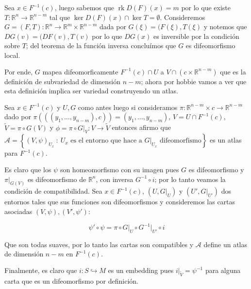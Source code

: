 \documentclass[11pt]{article}
\newcommand{\A}{\mathcal{A}}
\newcommand{\inc}{\hookrightarrow}
\newcommand{\R}{{\mathbb{R}}}
\newcommand\tq{~:~}
\newcommand{\sett}[1]{\left\lbrace#1\right\rbrace}
\DeclareMathOperator{\rk}{rk}
\numberwithin{theorem}{subsection}
\newcommand{\qed}{\nobreak \ifvmode \relax \else
	\ifdim\lastskip<1.5em \hskip-\lastskip
	\hskip1.5em plus0em minus0.5em \fi \nobreak
	\vrule height0.75em width0.5em depth0.25em\fi}
\begin{document}
\begin{solution}
	Sea $x \in F^{-1}(c)$, luego sabemos que $\rk D(F)(x) = m$ por lo que existe $T : \R^{n} \rightarrow \R^{n-m}$ tal que $\ker D(F)(x) \cap \ker T = \emptyset$. Consideremos $G = (F, T) : \R^n \rightarrow \R^{m} \times \R^{n-m}$ dada por $G(\xi) = (F(\xi), T(\xi)$ y notemos que $DG(v) = (DF(v), T(v)$ por lo que $DG(x)$ es inversible por la condici\'on sobre $T$; del teorema de la funci\'on inversa conclu\'imos que $G$ es difeomorfismo local.
	
	Por ende, $G$ mapea difeomorficamente $F^{-1}(c) \cap U$ a $V \cap \left(c \times \R^{n-m}\right)$ que es la definici\'on de subvariedad de dimensi\'on $n-m$; ahora por hobbie vamos a ver que esta definici\'on implica ser variedad construyendo un atlas.
	
	Sea $x \in F^{-1}(c)$ y $U, G$ como antes luego si consideramos $\pi: \R^{n-m} \times c \rightarrow \R^{n-m}$ dado por $\pi (((y_1, \dots , y_{n-m}),c)) =(y_1, \dots , y_{n-m})$, $V = U \cap F^{-1}(c)$, $\tilde{V} = \pi \circ G (V)$ y $\phi = \pi \circ G \vert_{V} : V \rightarrow \tilde{V}$ entonces afirmo que $\A = \sett{(V, \psi)_{U_x} \tq U_x \text{ es el entorno que hace a } G \vert_{U_x} \text{ difeomorfismo}}$ es un atlas para $F^{-1}(c)$.
	
	Es claro que los $\psi$ son homeomorfismo con su imagen pues $G$ es difeomorfismo y $\pi \vert_{G(V)}$ es difeomorfismo de $\R^n$, con inversa $G^{-1} \circ i$; por lo tanto veamos la condici\'on de compatibilidad. Sea $x \in F^{-1}(c)$, $(U,G \vert_U)$ y $(U', G\vert_{U'})$ dos entornos tales que sus funciones son difeomorfismos y consideremos las cartas asociadas $(V, \psi), (V', \psi')$:
	
	\begin{equation*}
		\psi' \circ \psi = \pi \circ G\vert_{U} \circ G^{-1} \vert_{U'} \circ i
	\end{equation*}
	
	Que son todas suaves, por lo tanto las cartas son compatibles y $\A$ define un atlas de dimensi\'on $n-m$ en $F^{-1}(c)$.
	
	Finalmente, es claro que $i : S \inc M$ es un embedding pues $i \vert_{\tilde{V}} = \psi^{-1}$ para alguna carta que es un difeomorfismo por definici\'on.\qed
	
	
\end{solution}
\end{document}
